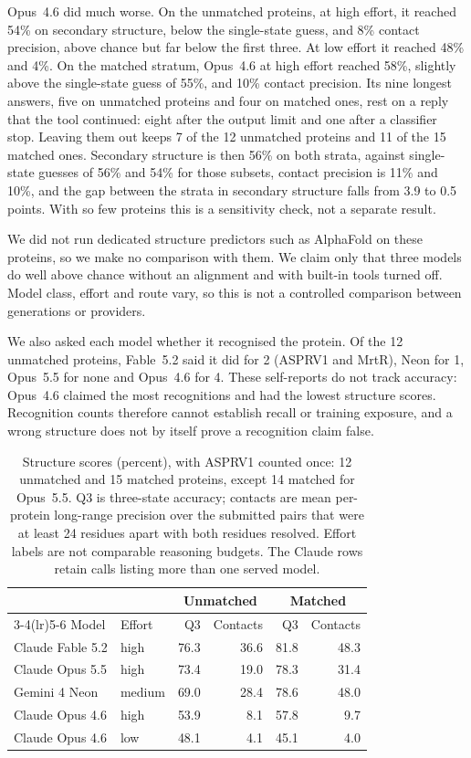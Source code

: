 \documentclass[11pt]{article}
\begin{document}
Opus~4.6 did much worse. On the unmatched proteins, at high effort, it reached 54\% on
secondary structure, below the single-state guess, and 8\% contact precision, above chance but far below
the first three. At low effort it reached 48\% and 4\%. On the matched stratum, Opus~4.6 at high effort
reached 58\%, slightly above the single-state guess of 55\%, and 10\% contact precision. Its nine longest
\tstrfn{} answers, five on unmatched proteins and four on matched ones, rest on a reply that the tool
continued: eight after the output limit and one after a classifier stop. Leaving them out keeps 7 of the 12
unmatched proteins and 11 of the 15 matched ones. Secondary structure is then 56\% on both strata, against
single-state guesses of 56\% and 54\% for those subsets, contact precision is 11\% and 10\%, and the gap
between the strata in secondary structure falls from 3.9 to 0.5 points. With so few proteins this is a sensitivity check, not a
separate result.

We did not run dedicated structure predictors such as AlphaFold \citep{jumper2021alphafold} on these
proteins, so we make no comparison with them. We claim only that three models do well above chance without an alignment and with built-in tools turned off. Model class,
effort and route vary, so this is not a controlled comparison between generations or providers.

We also asked each model whether it recognised the protein. Of the 12 unmatched proteins, Fable~5.2 said it
did for 2 (ASPRV1 and MrtR), Neon for 1, Opus~5.5 for none and Opus~4.6 for 4. These self-reports do not
track accuracy: Opus~4.6 claimed the most recognitions and had the lowest structure scores. Recognition counts therefore cannot establish
recall or training exposure, and a wrong structure does not by itself prove a recognition claim false.

\begin{table}[ht]
\centering\small
\caption{Structure scores (percent), with ASPRV1 counted once: 12 unmatched and 15 matched
proteins, except 14 matched for Opus~5.5. Q3 is three-state accuracy; contacts are mean per-protein
long-range precision over the submitted pairs that were at least 24 residues apart with both residues
resolved. Effort labels are not comparable reasoning budgets. The Claude rows retain calls
listing more than one served model.}
\label{tab:structure}
\begin{tabular}{llrrrr}
\toprule
 & & \multicolumn{2}{c}{Unmatched} & \multicolumn{2}{c}{Matched} \\
\cmidrule(lr){3-4}\cmidrule(lr){5-6}
Model & Effort & Q3 & Contacts & Q3 & Contacts \\
\midrule
Claude Fable 5.2 & high & 76.3 & 36.6 & 81.8 & 48.3 \\
Claude Opus 5.5 & high & 73.4 & 19.0 & 78.3 & 31.4 \\
Gemini 4 Neon & medium & 69.0 & 28.4 & 78.6 & 48.0 \\
Claude Opus 4.6 & high & 53.9 & 8.1 & 57.8 & 9.7 \\
Claude Opus 4.6 & low & 48.1 & 4.1 & 45.1 & 4.0 \\
\bottomrule
\end{tabular}
\end{table}
\end{document}

